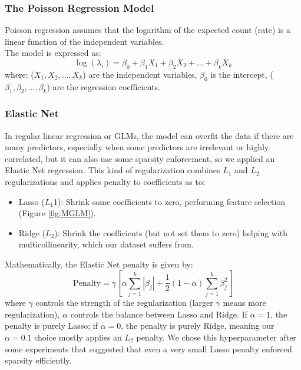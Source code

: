 \documentclass[a4paper, 12pt]{article}
\begin{document}
\begin{multicols}{2}
\subsubsection*{The Poisson Regression Model}
Poisson regression assumes that the logarithm of the expected count (rate) is a linear function of the independent variables.\\
The model is expressed as:
\begin{equation}
\log(\lambda_i)=\beta_0+\beta_1X_1+\beta_2X_2+\dots+\beta_kX_k
\end{equation}
where: ($X_1, X_2,\dots,X_k$) are the independent variables, $\beta_0$ is the intercept, ($\beta_1,\beta_2, \dots, \beta_k$) are the regression coefficients.
\subsubsection*{Elastic Net}
In regular linear regression or GLMs, the model can overfit the data if there are many predictors, especially when some predictors are irrelevant or highly correlated, but it can also use some sparsity enforcement, so we applied an Elastic Net regression. This kind of regularization combines $L_1$ and $L_2$ regularizations and applies penalty to coefficients as to: 
\begin{itemize}
\item Lasso ($L_1$1): Shrink some coefficients to zero, performing feature selection (Figure \ref{fig:MGLM}).
\item Ridge ($L_2$): Shrink the coefficients (but not set them to zero) helping with multicollinearity, which our dataset suffers from.
\end{itemize}
Mathematically, the Elastic Net penalty is given by:
\begin{equation}
\text{Penalty}= \gamma \left[\alpha \sum_{j=1}^k|\beta_j| + \frac{1}{2}(1-\alpha)\sum_{j=1}^k\beta_{j}^{2} \right]
\end{equation} 
where $\gamma$ controls the strength of the regularization (larger $\gamma$ means more regularization), $\alpha$ controls the balance between Lasso and Ridge. If $\alpha=1$, the penalty is purely Lasso; if $\alpha=0$, the penalty is purely Ridge, meaning our $\alpha = 0.1$ choice mostly applies an $L_2$ penalty. We chose this hyperparameter after some experiments that suggested that even a very small Lasso penalty enforced sparsity efficiently.

\end{multicols}
\end{document}
